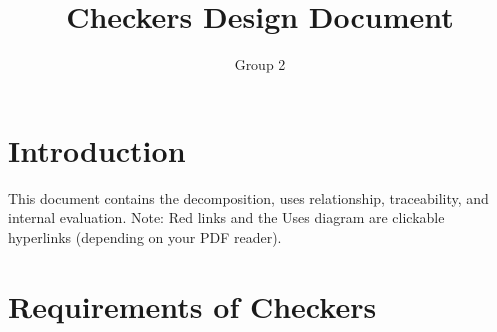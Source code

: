 \documentclass[10pt]{article}
\title{\bf Checkers Design Document}
\author{Group 2}
\date{}
\begin{document}
\maketitle

\tableofcontents

\section{Introduction}
    This document contains the decomposition, uses relationship, traceability, and internal evaluation.
    Note: Red links and the Uses diagram are clickable hyperlinks (depending on your PDF reader).
    
\section{Requirements of Checkers}
\end{document}

